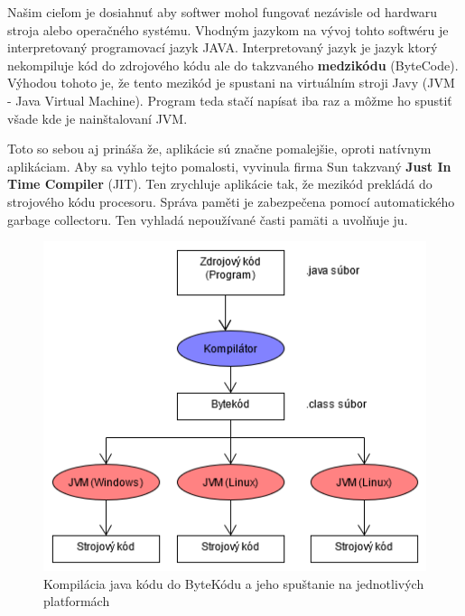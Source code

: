 \documentclass[10pt,twoside,slovak,a4paper]{article}
\begin{document}
\quad
Našim cieľom je dosiahnuť aby softwer mohol fungovať nezávisle od hardwaru stroja alebo operačného systému.
\quad
Vhodným jazykom na vývoj tohto softwéru je interpretovaný programovací jazyk JAVA. Interpretovaný jazyk je jazyk ktorý nekompiluje kód do zdrojového kódu ale do takzvaného \textbf{medzikódu} (ByteCode). Výhodou tohoto je, že tento mezikód je spustani na virtuálním stroji Javy (JVM - Java Virtual Machine). Program teda stačí napísat iba raz a môžme ho spustiť všade kde je nainštalovaní JVM.


Toto so sebou aj prináša že, aplikácie sú značne pomalejšie, oproti natívnym aplikáciam. Aby sa vyhlo tejto pomalosti, vyvinula firma Sun takzvaný \textbf{Just In Time Compiler} (JIT). Ten zrychluje aplikácie tak, že mezikód prekládá do strojového kódu procesoru. Správa paměti je zabezpečena pomocí automatického garbage collectoru. Ten vyhladá nepoužívané časti pamäti a uvolňuje ju.
\cite{Java}

\begin{figure}[!ht]
    \centering
    \includegraphics[scale=0.6]{javaByteCode.png}
    \caption{Kompilácia java kódu do ByteKódu a jeho spuštanie na jednotlivých platformách}
\end{figure}




{}

\end{document}
